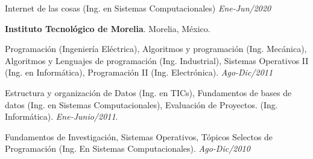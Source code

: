 \documentclass[10pt]{article}
\newenvironment{innerlist}[1][\enskip\textbullet]%
        {\begin{compactitem}[#1]}{\end{compactitem}}
\newcommand{\blankline}{\quad\pagebreak[2]}
\begin{document}
\begin{innerlist}

\item Internet de las cosas (Ing. en Sistemas Computacionales) \textit{Ene-Jun/2020}

\end{innerlist}


\blankline


\textbf{Instituto Tecnológico de Morelia}. Morelia, México.

\begin{innerlist}

\item Programación (Ingeniería Eléctrica), Algoritmos y programación (Ing. Mecánica), Algoritmos y Lenguajes de programación (Ing. Industrial), Sistemas Operativos II (Ing. en Informática), Programación II (Ing. Electrónica). \textit{Ago-Dic/2011} 
\item Estructura y organización de Datos (Ing. en TICs), Fundamentos de bases de datos (Ing. en Sistemas Computacionales), Evaluación de Proyectos. (Ing. Informática). \textit{Ene-Junio/2011}.
\item Fundamentos de Investigación, Sistemas Operativos, Tópicos Selectos de Programación (Ing. En Sistemas Computacionales).  \textit{Ago-Dic/2010} 

\end{innerlist}
\end{document}
